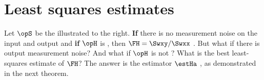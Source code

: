 \section{Least squares estimates}
\begin{minipage}{\tw-50mm}
Let $\opS$ be the  illustrated to the right.
\textbf{If} there is no measurement noise on the input and output and \textbf{if}
$\opH$ is , then
$\FH = \Swxy/\Swxx$ .
But what if there is output measurement noise?
And what if $\opH$ is not ?
What is the best least-squares estimate of $\FH$?
The answer is the estimator $\estHa$ ,
as demonstrated in the next theorem.
\end{minipage}
\hfill{}

